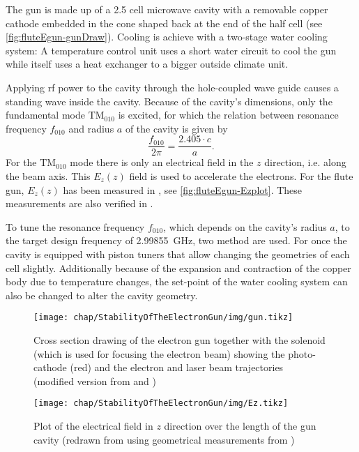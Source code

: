The gun is made up of a 2.5 cell microwave cavity with a removable copper cathode embedded in the cone shaped back at the end of the half cell (see \autoref{fig:fluteEgun-gunDraw}). Cooling is achieve with a two-stage water cooling system: A temperature control unit uses a short water circuit to cool the gun while itself uses a heat exchanger to a bigger outside climate unit.

Applying \gls{rf} power to the cavity through the hole-coupled wave guide causes a standing wave inside the cavity. Because of the cavity's dimensions, only the fundamental mode $\text{TM}_{010}$ is excited, for which the relation between resonance frequency $f_{010}$ and radius $a$ of the cavity is given by
\begin{equation}
\frac{f_{010}}{2\pi}=\frac{2.405 \cdot c}{a}.
\end{equation}
For the $\text{TM}_{010}$ mode there is only an electrical field in the $z$ direction, i.e. along the beam axis. This $E_z(z)$ field is used to accelerate the electrons. For the \gls{flute} gun, $E_z(z)$ has been measured in \cite{Bossart:clic}, see \autoref{fig:fluteEgun-Ezplot}. These measurements are also verified in \cite{Schuh2014}.

To tune the resonance frequency $f_{010}$, which depends on the cavity's radius $a$, to the target design frequency of \SI{2.99855}{\GHz}, two method are used. For once the cavity is equipped with piston tuners that allow changing the geometries of each cell slightly. Additionally because of the expansion and contraction of the copper body due to temperature changes, the set-point of the water cooling system can also be changed to alter the cavity geometry.

\begin{figure}[tb]
	\centering
	\texttt{[image: chap/StabilityOfTheElectronGun/img/gun.tikz]}
	\caption{Cross section drawing of the electron gun together with the solenoid (which is used for focusing the electron beam) showing the photo-cathode (red) and the electron and laser beam trajectories
	\\(modified version from \cite{Bossart:clic} and \cite{Bossart:288412})}
	\label{fig:fluteEgun-gunDraw}
\end{figure}

\begin{figure}[tb]
	\centering
	\texttt{[image: chap/StabilityOfTheElectronGun/img/Ez.tikz]}
	\caption{Plot of the electrical field in $z$ direction over the length of the gun cavity (redrawn from \cite{Bossart:clic} using geometrical measurements from \cite{Hoeninger2014})}
	\label{fig:fluteEgun-Ezplot}
\end{figure}

